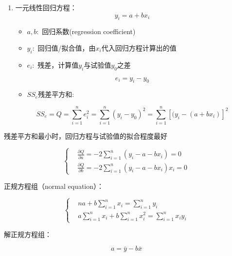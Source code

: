 \documentclass[UTF8]{ctexart}
\begin{document}
\begin{enumerate}[•]
\item 一元线性回归方程：
\begin{equation}
y_{i}=a+bx_{i} 
\end{equation}

\begin{itemize}
\item $a,b:$ 回归系数(regression coefficient)
\item $y_{i}:$ 回归值/拟合值，由$x_{i}$代入回归方程计算出的值
\item $e_{i}:$ 残差，计算值$y_{i}$与试验值$y_{0}$之差
\end{itemize}
\begin{equation}
e_{i}=y_{i}-y_{0} 
\end{equation}
\begin{itemize}
\item $SS_{e}$残差平方和:
\end{itemize}
\begin{equation}
SS_{e}=Q=\sum_{i=1}^ne_{i}^{2}=\sum_{i=1}^n(y_{i}-y_{0})^{2}=\sum_{i=1}^n[(y_{i}-(a+bx_{i})]^2     
\end{equation}
\end{enumerate}
\par 残差平方和最小时，回归方程与试验值的拟合程度最好


\begin{equation}
\left\{
\begin{aligned}
&\frac{\partial Q}{\partial a}=-2\sum_{i=1}^n(y_{i}-a-bx_{i})=0\\
&\frac{\partial Q}{\partial b}=-2\sum_{i=1}^n(y_{i}-a-bx_{i})x_{i}=0
\end{aligned}
\right.
\end{equation}
\par 正规方程组（normal equation）：

\begin{equation}
\left\{
\begin{aligned}
&na+b\sum_{i=1}^nx_{i}=\sum_{i=1}^ny_{i}\\
&a\sum_{i=1}^nx_{i}+b\sum_{i=1}^nx_{i}^{2}=\sum_{i=1}^nx_{i}y_{i}
\end{aligned}
\right.
\end{equation}


\par 解正规方程组：

\begin{equation}
a=\bar{y}-b\bar{x}
\end{equation}
\end{document}
